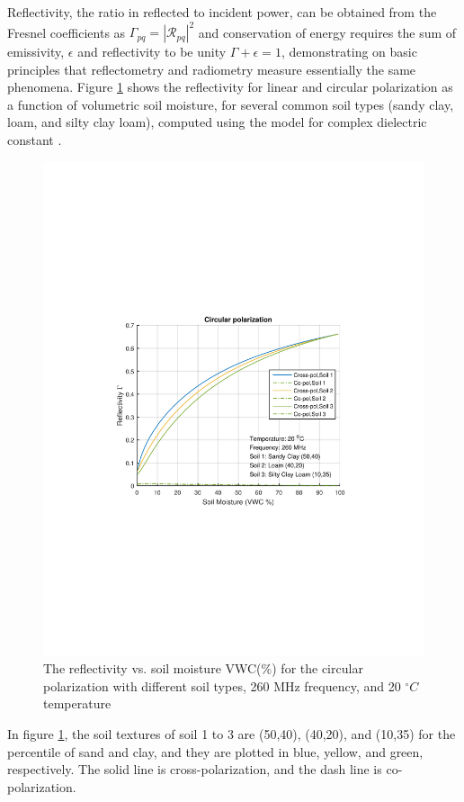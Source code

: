 \documentclass[draftcls,onecolumn]{IEEEtran}  %
\begin{document}
Reflectivity, the ratio in reflected to incident power, can be obtained from the Fresnel coefficients as $\Gamma_{pq} = |\mathcal{R}_{pq}|^2$ and conservation of energy requires the sum of emissivity, $\epsilon$ and reflectivity to be unity $\Gamma + \epsilon = 1$, demonstrating on basic principles that reflectometry and radiometry measure essentially the same phenomena. 
Figure \ref{fig:reflectivity} shows the reflectivity for linear and circular polarization as a function of volumetric soil moisture, for several common soil types (sandy clay, loam, and silty clay loam), computed using the model for complex dielectric constant  \cite{Peplinski:1995} \cite{Peplinski_correct:1995}.   
\begin{figure}[t!]
	\centering
	\includegraphics[width=6.5in]{pdf/gamma_vs_mv3.pdf}
	\caption{The reflectivity vs. soil moisture VWC($\%$) for the circular polarization with different soil types, 260 MHz frequency, and 20 $^\circ C$ temperature}
	\centering
	\label{fig:reflectivity}
\end{figure}
In figure \ref{fig:reflectivity}, the soil textures  of soil 1 to 3 are  (50,40), (40,20), and (10,35) for the percentile of sand and clay, and they are plotted in blue, yellow, and green, respectively. The solid line is cross-polarization, and the dash line is co-polarization.
\end{document}
